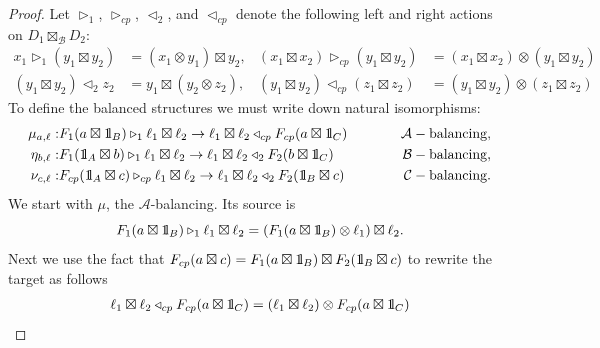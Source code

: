 \documentclass[a4paper]{article}
\numberwithin{equation}{section}
\newcommand{\idty}{{\mathrm{1}\mkern-4mu{\mathchoice{}{}{\mskip-0.5mu}{\mskip-1mu}}\mathrm{l}}}
\newcommand{\1}{{\mathrm{1}\mkern-4mu{\mathchoice{}{}{\mskip-0.5mu}{\mskip-1mu}}\mathrm{l}}}
\newcommand{\A}{\mathcal{A}}
\newcommand{\B}{\mathcal{B}}
\newcommand{\C}{\mathcal{C}}
\begin{document}
\begin{proof}
Let $\triangleright_1$, $\triangleright_{cp}$, $\triangleleft_2$, and $\triangleleft_{cp}$ denote the following left and right actions on $D_1\boxtimes_\B D_2$: 
\begin{equation}\label{eq:centering-nat-trans}
  \begin{aligned}
    x_1\triangleright_1 \!(y_1 \boxtimes y_2) &= (x_1\otimes y_1) \boxtimes y_2,  &
    (x_1\boxtimes x_2)\triangleright_{cp} \!(y_1\boxtimes y_2) &= (x_1\boxtimes x_2)\otimes (y_1\boxtimes y_2)
    \\
    (y_1 \boxtimes y_2) \triangleleft_2 z_2 &= y_1 \boxtimes (y_2\otimes z_2), &
    (y_1\boxtimes y_2) \triangleleft_{cp} (z_1\boxtimes z_2) &= (y_1\boxtimes y_2) \otimes (z_1\boxtimes z_2)
\end{aligned}
\end{equation}
To define the balanced structures we must write down natural isomorphisms:
\begin{equation}
  \begin{aligned}\label{eq:the-balancings}
    \mu_{a,\ell} : &F_1(a\boxtimes \idty_B) \triangleright_1 \ell_1\boxtimes \ell_2 \to \ell_1\boxtimes \ell_2 \triangleleft_{cp} F_{cp}(a \boxtimes \idty_C)  &\hspace{1cm} \A-\text{balancing},\\
    \eta_{b,\ell} : &F_1(\idty_A\boxtimes b) \triangleright_1 \ell_1\boxtimes \ell_2 \to \ell_1\boxtimes \ell_2 \triangleleft_2 F_2(b\boxtimes \idty_C)  & \hspace{1cm} \B-\text{balancing},\\
    \nu_{c,\ell} : &F_{cp}(\idty_A \boxtimes c) \triangleright_{cp} \ell_1\boxtimes \ell_2 \to \ell_1\boxtimes \ell_2 \triangleleft_{2} F_{2}(\idty_B \boxtimes c) &\hspace{1cm} \C-\text{balancing}.
  \end{aligned}
\end{equation}
We start with $\mu$, the $\A$-balancing. Its source is
\begin{equation}
  F_1(a\boxtimes \idty_B)\triangleright_1 \ell_1\boxtimes \ell_2 = \left(F_1(a\boxtimes \idty_B) \otimes \ell_1\right)\boxtimes \ell_2.
\end{equation}
Next we use the fact that $F_{cp}(a\boxtimes c) = F_1(a\boxtimes \idty_B) \boxtimes F_2(\idty_B\boxtimes c)$ to rewrite the target as follows
\begin{equation}
  \begin{aligned}
    \ell_1\boxtimes \ell_2 \triangleleft_{cp} F_{cp}(a\boxtimes \idty_C)&= (\ell_1\boxtimes \ell_2) \otimes F_{cp}(a\boxtimes \idty_C) \\

\end{aligned}
\end{equation}
\end{proof}
\end{document}
